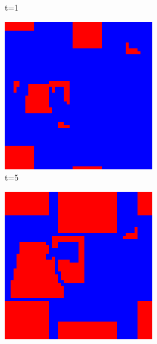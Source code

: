 \documentclass[a4paper, 11pt]{article}
\begin{document}
\begin{figure}[H]
\begin{subfigure}{.33\textwidth}
  \caption{t=1}
\end{subfigure}%
\begin{subfigure}{.33\textwidth}
  \centering
  \includegraphics[width=0.9\linewidth]{PRISONERS_DILEMMA_MOORE_50x50_t05}
  \caption{t=5}
\end{subfigure}
\begin{subfigure}{.33\textwidth}
  \centering
  \includegraphics[width=0.9\linewidth]{PRISONERS_DILEMMA_MOORE_50x50_t10}

\end{subfigure}
\end{figure}
\end{document}
